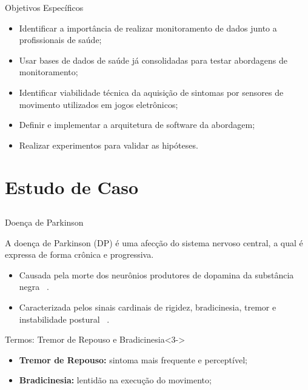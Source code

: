 \documentclass{beamer}
\begin{document}
\begin{frame}{Objetivos Específicos}
	\begin{block}{}
	\begin{itemize}[<+->]
      \item Identificar a importância de realizar monitoramento de dados junto a profissionais de saúde;
			\item Usar bases de dados de saúde já consolidadas para testar abordagens de monitoramento;
			\item Identificar viabilidade técnica da aquisição de sintomas por sensores de movimento utilizados em jogos eletrônicos;
			\item Definir e implementar a arquitetura de software da abordagem;
			\item Realizar experimentos para validar as hipóteses.
	\end{itemize}
	\end{block}
\end{frame}

\section{Estudo de Caso}
\subsection{}
\begin{frame}{Doença de Parkinson}
  \begin{block}{}
    A doença de Parkinson (DP) é uma afecção do sistema nervoso central, a qual é expressa de forma crônica e progressiva. 
      \begin{itemize}[<+->]
       \item Causada pela morte dos neurônios produtores de dopamina da substância negra ~\cite{protpar010}. 
       \item Caracterizada pelos sinais cardinais de rigidez, bradicinesia, tremor e instabilidade postural ~\cite{menezes2003}.
      \end{itemize}
  \end{block}

  \begin{block}{Termos: Tremor de Repouso e Bradicinesia}<3->
      \begin{itemize}
       \item \textbf{Tremor de Repouso:} sintoma mais frequente e perceptível;
       \item \textbf{Bradicinesia:} lentidão na execução do movimento;
      \end{itemize}
  \end{block}
\end{frame}
\end{document}
